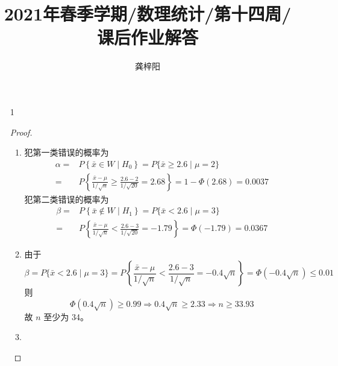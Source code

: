 \documentclass[normal,founder,mtpro2,cn]{elegantnote}
\title{2021年春季学期/数理统计/第十四周/课后作业解答}
\author{龚梓阳}
\date{\zhtoday}
\begin{document}
\maketitle
\begin{enumerate}
    \item[1]
        \begin{proof}
            \begin{enumerate}
                \item 犯第一类错误的概率为
                      \begin{equation*}
                          \begin{aligned}
                              \alpha= & P\left\{\bar{x}\in W\mid H_{0}\right\}=P\{\bar{x}\geq 2.6\mid\mu=2\}                                 \\
                              =       & P\left\{\frac{\bar{x}-\mu}{1/\sqrt{n}}\geq\frac{2.6-2}{1/\sqrt{20}}=2.68\right\}=1-\Phi(2.68)=0.0037
                          \end{aligned}
                      \end{equation*}
                      犯第二类错误的概率为
                      \begin{equation*}
                          \begin{aligned}
                              \beta= & P\left\{\bar{x}\notin W\mid H_{1}\right\}=P\{\bar{x}<2.6\mid\mu=3\}                               \\
                              =      & P\left\{\frac{\bar{x}-\mu}{1/\sqrt{n}}<\frac{2.6-3}{1/\sqrt{20}}=-1.79\right\}=\Phi(-1.79)=0.0367
                          \end{aligned}
                      \end{equation*}
                \item 由于
                      \begin{equation*}
                          \beta=P\{\bar{x}<2.6\mid\mu=3\}=P\left\{\frac{\bar{x}-\mu}{1/\sqrt{n}}<\frac{2.6-3}{1/\sqrt{n}}=-0.4\sqrt{n}\right\}=\Phi(-0.4\sqrt{n})\leq 0.01
                      \end{equation*}
                      则
                      \begin{equation*}
                          \Phi(0.4\sqrt{n})\geq 0.99\Rightarrow 0.4\sqrt{n}\geq 2.33\Rightarrow n\geq 33.93
                      \end{equation*}
                      故 $n$ 至少为 34。
                \item

\end{enumerate}
\end{proof}
\end{enumerate}
\end{document}
